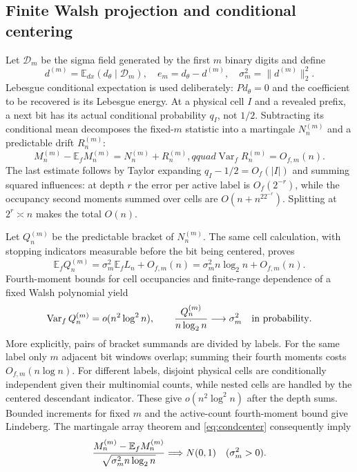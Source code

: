 \documentclass[11pt]{article}
\numberwithin{equation}{section}
\theoremstyle{definition}\newtheorem{definition}[theorem]{Definition}
\theoremstyle{remark}\newtheorem{remark}[theorem]{Remark}
\newcommand{\E}{\mathbb E}\newcommand{\Pp}{\mathbb P}
\newcommand{\Var}{\operatorname {Var}}\newcommand{\Cov}{\operatorname {Cov}}
\newcommand{\1}{\mathbf 1}\newcommand{\cD}{\mathcal D}
\begin{document}
\subsection{Finite Walsh projection and conditional centering}
Let $\mathcal D_m$ be the sigma field generated by the first $m$ binary
digits and define
\begin{equation}
 d^{(m)}=\E_{dx}(d_\theta\mid\mathcal D_m),\quad
 e_m=d_\theta-d^{(m)},\quad \sigma_m^2=\|d^{(m)}\|_2^2.  \label{eq:dmnon}
\end{equation}
Lebesgue conditional expectation is used deliberately: $Pd_\theta=0$ and
the coefficient to be recovered is its Lebesgue energy.  At a physical
cell $I$ and a revealed prefix, a next bit has its actual conditional
probability $q_I$, not $1/2$.  Subtracting its conditional mean decomposes
the fixed-$m$ statistic into a martingale $N_n^{(m)}$ and a predictable
drift $R_n^{(m)}$:
\begin{equation}
 M_n^{(m)}-\E_fM_n^{(m)}=N_n^{(m)}+R_n^{(m)},qquad
 \Var_fR_n^{(m)}=O_{f,m}(n).                              \label{eq:condcenter}
\end{equation}
The last estimate follows by Taylor expanding $q_I-1/2=O_f(|I|)$ and
summing squared influences: at depth $r$ the error per active label is
$O_f(2^{-r})$, while the occupancy second moments summed over cells are
$O(n+n^22^{-r})$.  Splitting at $2^r\asymp n$ makes the total $O(n)$.

Let $Q_n^{(m)}$ be the predictable bracket of $N_n^{(m)}$.  The same
cell calculation, with stopping indicators measurable before the bit being
centered, proves
\begin{equation}
 \E_fQ_n^{(m)}=\sigma_m^2\E_fL_n+O_{f,m}(n)
 =\sigma_m^2n\log_2n+O_{f,m}(n).                          \label{eq:bracketmean}
\end{equation}
Fourth-moment bounds for cell occupancies and finite-range dependence of a
fixed Walsh polynomial yield
\begin{equation}
 \Var_fQ_n^{(m)}=o(n^2\log^2n),\qquad
 {Q_n^{(m)}\over n\log_2n}\longrightarrow\sigma_m^2
 \quad\hbox{in probability}.                             \label{eq:bracketconc}
\end{equation}
More explicitly, pairs of bracket summands are divided by labels.  For the
same label only $m$ adjacent bit windows overlap; summing their fourth
moments costs $O_{f,m}(n\log n)$.  For different labels, disjoint physical
cells are conditionally independent given their multinomial counts, while
nested cells are handled by the centered descendant indicator.  These give
$o(n^2\log^2 n)$ after the depth sums.  Bounded increments for fixed $m$
and the active-count fourth-moment bound give Lindeberg.  The martingale
array theorem and \eqref{eq:condcenter} consequently imply
\begin{equation}
 {M_n^{(m)}-\E_fM_n^{(m)}\over
       \sqrt{\sigma_m^2n\log_2n}}\Longrightarrow N(0,1)
 \quad(\sigma_m^2>0).                                    \label{eq:fixedmnonclt}
\end{equation}
\end{document}
